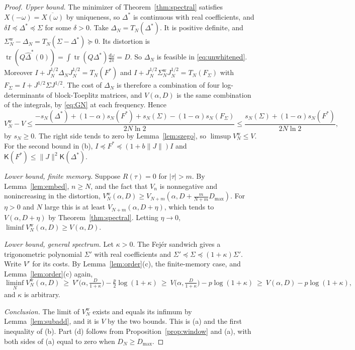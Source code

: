 \documentclass[11pt,onecolumn]{IEEEtran}
\newcommand{\tr}{\operatorname{tr}}
\newcommand{\dw}{\tfrac{d\omega}{2\pi}}
\begin{document}
\begin{proof}
\emph{Upper bound.} The minimizer of Theorem~\ref{thm:spectral}
satisfies $X(-\omega)=\overline{X(\omega)}$ by uniqueness, so
$\Delta^\ast$ is continuous with real coefficients, and
$\delta I\preceq\Delta^\ast\preceq\Sigma$ for some $\delta>0$. Take
$\Delta_N=T_N(\Delta^\ast)$. It is positive definite, and
$\Sigma^{\mathrm w}_N-\Delta_N=T_N(\Sigma-\Delta^\ast)\succeq0$. Its
distortion is $\tr(Q\hat\Delta^\ast(0))=\int\tr(Q\Delta^\ast)\dw=D$. So
$\Delta_N$ is feasible in \eqref{eq:unwhitened}. Moreover
$I+J_N^{1/2}\Delta_NJ_N^{1/2}=T_N(F^\ast)$ and
$I+J_N^{1/2}\Sigma^{\mathrm w}_NJ_N^{1/2}=T_N(F_\Sigma)$ with
$F_\Sigma=I+J^{1/2}\Sigma J^{1/2}$. The cost of $\Delta_N$ is therefore a
combination of four log-determinants of block-Toeplitz matrices, and
$V(\alpha,D)$ is the same combination of the integrals, by
\eqref{eq:GN} at each frequency. Hence
\[
V^{\mathrm w}_N-V\le\frac{-s_N(\Delta^\ast)+(1-\alpha)s_N(F^\ast)+s_N(\Sigma)-(1-\alpha)s_N(F_\Sigma)}{2N\ln2}
\le\frac{s_N(\Sigma)+(1-\alpha)s_N(F^\ast)}{2N\ln2},
\]
by $s_N\ge0$. The right side tends to zero by Lemma~\ref{lem:szego}, so
$\limsup V^{\mathrm w}_N\le V$. For the second bound in (b),
$I\preceq F^\ast\preceq(1+b\|J\|)I$ and
$\mathsf K(F^\ast)\le\|J\|^2\mathsf K(\Delta^\ast)$.

\emph{Lower bound, finite memory.} Suppose $R(\tau)=0$ for $|\tau|>m$.
By Lemma~\ref{lem:embed}, $n\ge N$, and the fact that $V_n$ is
nonnegative and nonincreasing in the distortion,
$V^{\mathrm w}_N(\alpha,D)\ge V_{N+m}(\alpha,D+\tfrac m{N+m}D_{\max})$. For
$\eta>0$ and $N$ large this is at least $V_{N+m}(\alpha,D+\eta)$, which
tends to $V(\alpha,D+\eta)$ by Theorem~\ref{thm:spectral}. Letting
$\eta\to0$, $\liminf V^{\mathrm w}_N(\alpha,D)\ge V(\alpha,D)$.

\emph{Lower bound, general spectrum.} Let $\kappa>0$. The Fej\'er
sandwich gives a trigonometric polynomial $\Sigma'$ with real
coefficients and
$\Sigma'\preceq\Sigma\preceq(1+\kappa)\Sigma'$. Write $V'$ for its costs.
By Lemma~\ref{lem:order}(c), the finite-memory case, and
Lemma~\ref{lem:order}(c) again,
\[
\liminf_NV^{\mathrm w}_N(\alpha,D)\ \ge\ V'\bigl(\alpha,\tfrac D{1+\kappa}\bigr)-\tfrac p2\log(1+\kappa)
\ \ge\ V\bigl(\alpha,\tfrac D{1+\kappa}\bigr)-p\log(1+\kappa)\ \ge\ V(\alpha,D)-p\log(1+\kappa),
\]
and $\kappa$ is arbitrary.

\emph{Conclusion.} The limit of $V^{\mathrm w}_N$ exists and equals its
infimum by Lemma~\ref{lem:subadd}, and it is $V$ by the two bounds. This
is (a) and the first inequality of (b). Part (d) follows from
Proposition~\ref{prop:window} and (a), with both sides of (a) equal to
zero when $D_N\ge D_{\max}$.


\end{proof}
\end{document}
